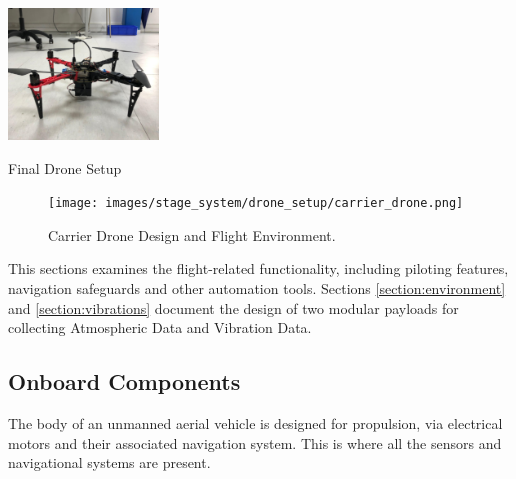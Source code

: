 \begin{marginfigure}%
    \raggedright
    
    \hspace{0.25cm}
    \vspace{1cm}
    \includegraphics[width=4cm]{images/stage_system/drone_setup.png}
    \caption{Final Drone Setup}
    \label{fig:drone_presentation}
\end{marginfigure}


\begin{figure}[!h]
    \raggedright
    \hspace{1.5cm}
    {\texttt{[image: images/stage\_system/drone\_setup/carrier\_drone.png]}}
    
    \caption{Carrier Drone Design and Flight Environment.}
    \label{fig:RC_screen}
\end{figure}


This sections examines the flight-related functionality, including piloting features, navigation safeguards and other automation tools. Sections \ref{section:environment} and \ref{section:vibrations} document the design of two modular payloads for collecting Atmospheric Data and Vibration Data.




\subsection{Onboard Components}\label{section:msp_overview}

The body of an unmanned aerial vehicle is designed for propulsion, via electrical motors and their associated navigation system. This is where all the sensors and navigational systems are present.

